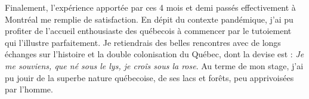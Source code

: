 Finalement, l'expérience apportée par ces 4 mois et demi passés effectivement à Montréal me remplie de satisfaction. En dépit du contexte pandémique, j'ai pu profiter de l'accueil enthousiaste des québecois à commencer par le tutoiement qui l'illustre parfaitement. Je retiendrais des belles rencontres avec de longs échanges sur l'histoire et la double colonisation du Québec, dont la devise est : \emph{Je me souviens, que né sous le lys, je croîs sous la rose}. Au terme de mon stage, j'ai pu jouir de la superbe nature québecoise, de ses lacs et forêts, peu apprivoisées par l'homme.


